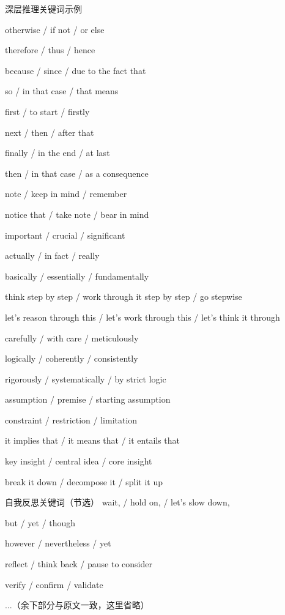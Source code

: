 \begin{PromptBox}{深层推理关键词示例}

otherwise / if not / or else

therefore / thus / hence

because / since / due to the fact that

so / in that case / that means

first / to start / firstly

next / then / after that

finally / in the end / at last

then / in that case / as a consequence

note / keep in mind / remember

notice that / take note / bear in mind 

important / crucial / significant

actually / in fact / really

basically / essentially / fundamentally 

think step by step / work through it step by step / go stepwise

let's reason through this / let's work through this / let's think it through

carefully / with care / meticulously

logically / coherently / consistently

rigorously / systematically / by strict logic

assumption / premise / starting assumption

constraint / restriction / limitation

it implies that / it means that / it entails that

key insight / central idea / core insight

break it down / decompose it / split it up



\end{PromptBox}

\begin{PromptBox}{自我反思关键词（节选）}
wait, / hold on, / let's slow down,

but / yet / though

however / nevertheless / yet

reflect / think back / pause to consider

verify / confirm / validate

...（余下部分与原文一致，这里省略）
\end{PromptBox}

